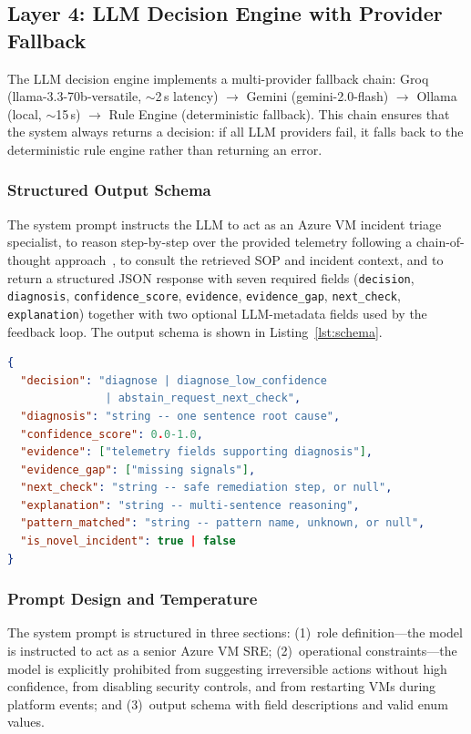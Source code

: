 \documentclass[a4paper,10pt,journal,compsoc]{IEEEtran}
\begin{document}
\subsection{Layer 4: LLM Decision Engine with Provider Fallback}

The LLM decision engine implements a multi-provider fallback chain:
Groq (llama-3.3-70b-versatile, $\sim$2\,s latency) $\to$ Gemini
(gemini-2.0-flash) $\to$ Ollama (local,
$\sim$15\,s) $\to$ Rule Engine (deterministic fallback). This chain
ensures that the system always returns a decision: if all LLM providers fail, it
falls back to the deterministic rule engine rather than returning an
error.

\subsubsection{Structured Output Schema}

The system prompt instructs the LLM to act as an Azure VM incident
triage specialist, to reason step-by-step over the provided telemetry
following a chain-of-thought approach~\cite{wei2022cot},
to consult the retrieved SOP and incident context, and to return a
structured JSON response with seven required fields
(\texttt{decision}, \texttt{diagnosis}, \texttt{confidence\_score},
\texttt{evidence}, \texttt{evidence\_gap}, \texttt{next\_check},
\texttt{explanation}) together with two optional LLM-metadata fields
used by the feedback loop. The output schema is shown in
Listing~\ref{lst:schema}.

\begin{lstlisting}[language=json,
  caption={LLM structured output schema.},
  label={lst:schema}]
{
  "decision": "diagnose | diagnose_low_confidence
               | abstain_request_next_check",
  "diagnosis": "string -- one sentence root cause",
  "confidence_score": 0.0-1.0,
  "evidence": ["telemetry fields supporting diagnosis"],
  "evidence_gap": ["missing signals"],
  "next_check": "string -- safe remediation step, or null",
  "explanation": "string -- multi-sentence reasoning",
  "pattern_matched": "string -- pattern name, unknown, or null",
  "is_novel_incident": true | false
}
\end{lstlisting}

\subsubsection{Prompt Design and Temperature}

The system prompt is structured in three sections: (1)~role
definition---the model is instructed to act as a senior Azure VM SRE;
(2)~operational constraints---the model is explicitly prohibited from
suggesting irreversible actions without high confidence, from disabling
security controls, and from restarting VMs during platform events; and
(3)~output schema with field descriptions and valid enum values.
\end{document}
